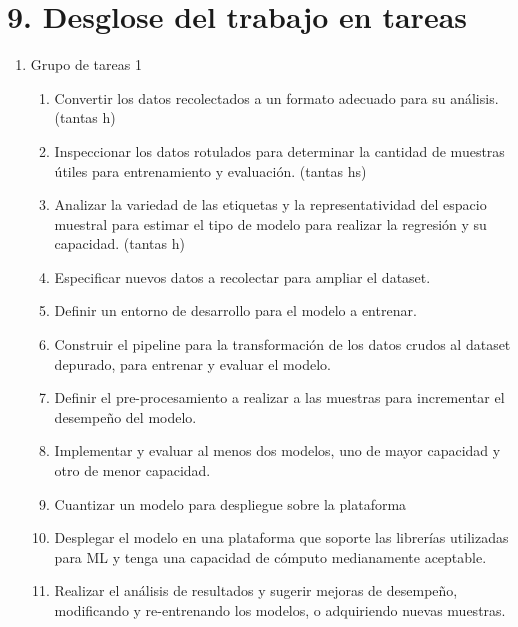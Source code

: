 \documentclass[
11pt, %
codirector, %
]{charter}
\begin{document}
\section{9. Desglose del trabajo en tareas}
\label{sec:wbs}


\begin{enumerate}
\item Grupo de tareas 1
	\begin{enumerate}
	\item Convertir los datos recolectados a un formato adecuado para su análisis. (tantas h)
	\item Inspeccionar los datos rotulados para determinar la cantidad de muestras útiles para entrenamiento y evaluación. (tantas hs)
	\item Analizar la variedad de las etiquetas y la representatividad del espacio muestral para estimar el tipo de modelo para realizar la regresión y su capacidad. (tantas h)
	\item Especificar nuevos datos a recolectar para ampliar el dataset.
	\item Definir un entorno de desarrollo para el modelo a entrenar.
	\item Construir el pipeline para la transformación de los datos crudos al dataset depurado, para entrenar y evaluar el modelo.
	\item Definir el pre-procesamiento a realizar a las muestras para incrementar el desempeño del modelo.
	\item Implementar y evaluar al menos dos modelos, uno de mayor capacidad y otro de menor capacidad.
	\item Cuantizar un modelo para despliegue sobre la plataforma
	\item Desplegar el modelo en una plataforma que soporte las librerías utilizadas para ML y tenga una capacidad de cómputo medianamente aceptable.
	\item Realizar el análisis de resultados y sugerir mejoras de desempeño, modificando y re-entrenando los modelos, o adquiriendo nuevas muestras.
		

\end{enumerate}
\end{enumerate}
\end{document}
